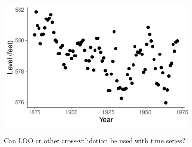 \documentclass[english,t]{beamer}
\begin{document}
\begin{frame}{}

  \includegraphics[width=10cm]{lake2data.pdf}

  
  {Can LOO or other cross-validation be used with time series?}
  
\end{frame}
\end{document}

